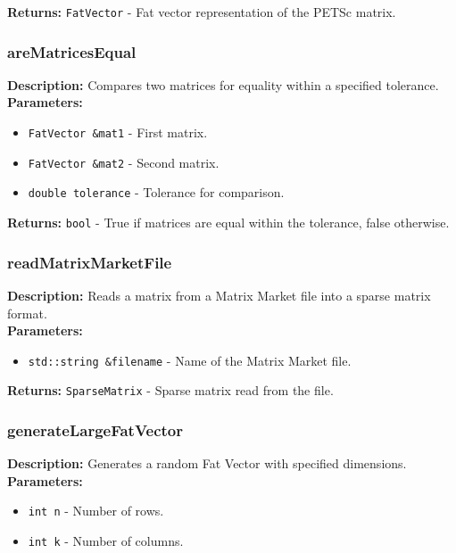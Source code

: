 \documentclass[12pt,oneside]{book} %
\begin{document}
\begin{subappendices}
    \textbf{Returns:} \texttt{FatVector} - Fat vector representation of the PETSc matrix.

    \subsubsection{areMatricesEqual}
    \textbf{Description:} Compares two matrices for equality within a specified tolerance.\\

    \textbf{Parameters:}
    \begin{itemize}
        \item \texttt{FatVector \&mat1} - First matrix.
        \item \texttt{FatVector \&mat2} - Second matrix.
        \item \texttt{double tolerance} - Tolerance for comparison.
    \end{itemize}

    \textbf{Returns:} \texttt{bool} - True if matrices are equal within the tolerance, false otherwise.

    \subsubsection{readMatrixMarketFile}
    \textbf{Description:} Reads a matrix from a Matrix Market file into a sparse matrix format.\\

    \textbf{Parameters:}
    \begin{itemize}
        \item \texttt{std::string \&filename} - Name of the Matrix Market file.
    \end{itemize}
    
    \textbf{Returns:} \texttt{SparseMatrix} - Sparse matrix read from the file.

    \subsubsection{generateLargeFatVector}
    \textbf{Description:} Generates a random Fat Vector with specified dimensions.\\

    \textbf{Parameters:}
    \begin{itemize}
        \item \texttt{int n} - Number of rows.
        \item \texttt{int k} - Number of columns.
    \end{itemize}


\end{subappendices}
\end{document}
